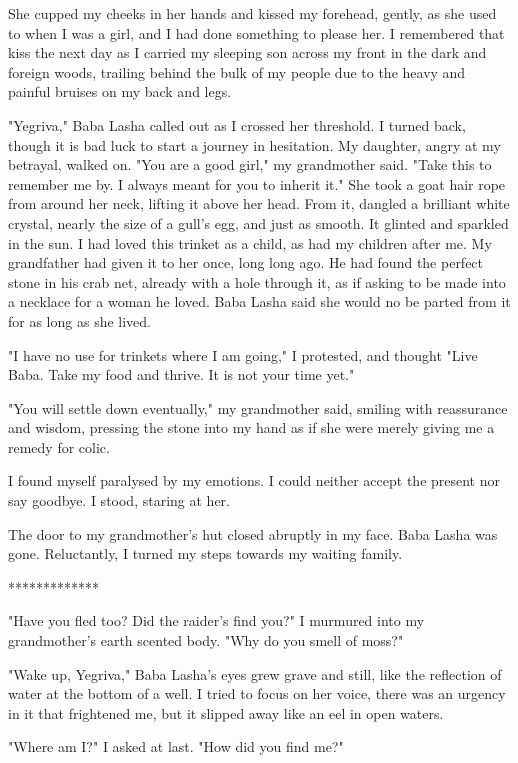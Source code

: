 She cupped my cheeks in her hands and kissed my forehead, gently, as she used to when I was a girl, and I had done something to please her. I remembered that kiss the next day as I carried my sleeping son across my front in the dark and foreign woods, trailing behind the bulk of my people due to the heavy and painful bruises on my back and legs.

"Yegriva," Baba Lasha called out as I crossed her threshold. I turned back, though it is bad luck to start a journey in hesitation. My daughter, angry at my betrayal, walked on. "You are a good girl," my grandmother said. "Take this to remember me by. I always meant for you to inherit it." She took a goat hair rope from around her neck, lifting it above her head. From it, dangled a brilliant white crystal, nearly the size of a gull's egg, and just as smooth. It glinted and sparkled in the sun. I had loved this trinket as a child, as had my children after me. My grandfather had given it to her once, long long ago. He had found the perfect stone in his crab net, already with a hole through it, as if asking to be made into a necklace for a woman he loved. Baba Lasha said she would no be parted from it for as long as she lived.

"I have no use for trinkets where I am going," I protested, and thought "Live Baba. Take my food and thrive. It is not your time yet."

"You will settle down eventually," my grandmother said, smiling with reassurance and wisdom, pressing the stone into my hand as if she were merely giving me a remedy for colic.

I found myself paralysed by my emotions. I could neither accept the present nor say goodbye. I stood, staring at her.

The door to my grandmother's hut closed abruptly in my face. Baba Lasha was gone. Reluctantly, I turned my steps towards my waiting family.

*************

"Have you fled too? Did the raider's find you?" I murmured into my grandmother's earth scented body. "Why do you smell of moss?"

"Wake up, Yegriva," Baba Lasha's eyes grew grave and still, like the reflection of water at the bottom of a well. I tried to focus on her voice, there was an urgency in it that frightened me, but it slipped away like an eel in open waters.

"Where am I?" I asked at last. "How did you find me?"

